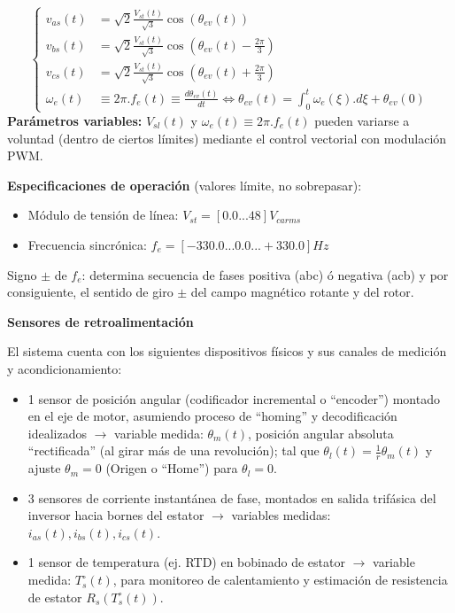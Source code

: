 \documentclass{article}
\begin{document}
\begin{equation}
\left\{
\begin{aligned}
v_{as}(t) &= \sqrt{2}\frac{V_{st}(t)}{\sqrt{3}}\cos(\theta_{ev}(t)) \\
v_{bs}(t) &= \sqrt{2}\frac{V_{st}(t)}{\sqrt{3}}\cos(\theta_{ev}(t) - \frac{2\pi}{3}) \\
v_{cs}(t) &= \sqrt{2}\frac{V_{st}(t)}{\sqrt{3}}\cos(\theta_{ev}(t) + \frac{2\pi}{3}) \\
\omega_e(t) &\equiv 2\pi.f_e(t) \equiv \frac{d\theta_{ev}(t)}{dt} \Leftrightarrow \theta_{ev}(t) = \int_0^t \omega_e(\xi).d\xi + \theta_{ev}(0)
\end{aligned}
\right.
\end{equation}
\textbf{Parámetros variables:}
$V_{sl}(t)$ y $\omega_e(t) \equiv 2\pi.f_e(t)$ pueden variarse a voluntad (dentro de ciertos límites) mediante el control vectorial con modulación PWM.

\textbf{Especificaciones de operación} (valores límite, no sobrepasar):
\begin{itemize}
\item Módulo de tensión de línea: $V_{st} = [0.0 ... 48] V_{ca rms}$
\item Frecuencia sincrónica: $f_e = [-330.0 ... 0.0 ... +330.0] Hz$
\end{itemize}
Signo $\pm$ de $f_e$: determina secuencia de fases positiva (abc) ó negativa (acb) y por consiguiente, el sentido de giro $\pm$ del campo magnético rotante y del rotor.

\noindent\textbf{Sensores de retroalimentación}

El sistema cuenta con los siguientes dispositivos físicos y sus canales de medición y acondicionamiento:
\begin{itemize}
\item 1 sensor de posición angular (codificador incremental o ``encoder'') montado en el eje de motor, asumiendo proceso de ``homing'' y decodificación idealizados $\rightarrow$ variable medida: $\theta_m(t)$, posición angular absoluta ``rectificada'' (al girar más de una revolución); tal que $\theta_l(t) = \frac{1}{r}\theta_m(t)$ y ajuste $\theta_m = 0$ (Origen o ``Home'') para $\theta_l = 0$.
\item 3 sensores de corriente instantánea de fase, montados en salida trifásica del inversor hacia bornes del estator $\rightarrow$ variables medidas: $i_{as}(t), i_{bs}(t), i_{cs}(t)$.
\item 1 sensor de temperatura (ej. RTD) en bobinado de estator $\rightarrow$ variable medida: $T^\circ_s(t)$, para monitoreo de calentamiento y estimación de resistencia de estator $R_s\left(T^\circ_s(t)\right)$.

\end{itemize}
\end{document}
